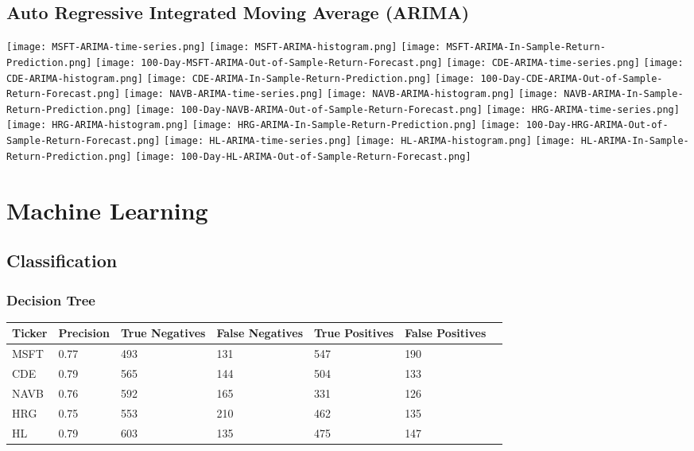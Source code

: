 \subsection{Auto Regressive Integrated Moving Average (ARIMA)}
\texttt{[image: MSFT-ARIMA-time-series.png]}
\texttt{[image: MSFT-ARIMA-histogram.png]}
\texttt{[image: MSFT-ARIMA-In-Sample-Return-Prediction.png]}
\texttt{[image: 100-Day-MSFT-ARIMA-Out-of-Sample-Return-Forecast.png]}
\texttt{[image: CDE-ARIMA-time-series.png]}
\texttt{[image: CDE-ARIMA-histogram.png]}
\texttt{[image: CDE-ARIMA-In-Sample-Return-Prediction.png]}
\texttt{[image: 100-Day-CDE-ARIMA-Out-of-Sample-Return-Forecast.png]}
\texttt{[image: NAVB-ARIMA-time-series.png]}
\texttt{[image: NAVB-ARIMA-histogram.png]}
\texttt{[image: NAVB-ARIMA-In-Sample-Return-Prediction.png]}
\texttt{[image: 100-Day-NAVB-ARIMA-Out-of-Sample-Return-Forecast.png]}
\texttt{[image: HRG-ARIMA-time-series.png]}
\texttt{[image: HRG-ARIMA-histogram.png]}
\texttt{[image: HRG-ARIMA-In-Sample-Return-Prediction.png]}
\texttt{[image: 100-Day-HRG-ARIMA-Out-of-Sample-Return-Forecast.png]}
\texttt{[image: HL-ARIMA-time-series.png]}
\texttt{[image: HL-ARIMA-histogram.png]}
\texttt{[image: HL-ARIMA-In-Sample-Return-Prediction.png]}
\texttt{[image: 100-Day-HL-ARIMA-Out-of-Sample-Return-Forecast.png]}

\section{Machine Learning}

\subsection{Classification}

\subsubsection{Decision Tree}

\begin{center}
    \begin{tabular}{ | l | l | l | | l | l | l | p{5cm} |}
    \hline
    Ticker & Precision & True Negatives & False Negatives & True Positives & False Positives \\ \hline
    MSFT & 0.77 & 493 & 131 & 547 & 190 \\ \hline
    CDE & 0.79 & 565 & 144 & 504 & 133 \\ \hline
    NAVB & 0.76 & 592 & 165 & 331 & 126 \\ \hline
    HRG & 0.75 & 553 & 210 & 462 & 135 \\ \hline
    HL & 0.79 & 603 & 135 & 475 & 147 \\
    \hline
    \end{tabular}
\end{center}

